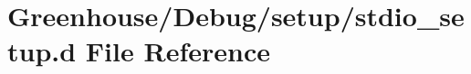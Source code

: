 \hypertarget{stdio__setup_8d}{}\section{Greenhouse/\+Debug/setup/stdio\+\_\+setup.d File Reference}
\label{stdio__setup_8d}

